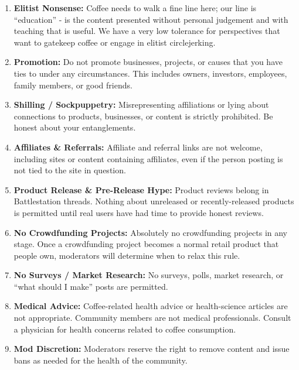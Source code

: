 \begin{enumerate}
    \item \textbf{Elitist Nonsense:} Coffee needs to walk a fine line here; our line is ``education'' - is the content presented without personal judgement and with teaching that is useful. We have a very low tolerance for perspectives that want to gatekeep coffee or engage in elitist circlejerking.
    
    \item \textbf{Promotion:} Do not promote businesses, projects, or causes that you have ties to under any circumstances. This includes owners, investors, employees, family members, or good friends.
    
    \item \textbf{Shilling / Sockpuppetry:} Misrepresenting affiliations or lying about connections to products, businesses, or content is strictly prohibited. Be honest about your entanglements.
    
    \item \textbf{Affiliates \& Referrals:} Affiliate and referral links are not welcome, including sites or content containing affiliates, even if the person posting is not tied to the site in question.
    
    \item \textbf{Product Release \& Pre-Release Hype:} Product reviews belong in Battlestation threads. Nothing about unreleased or recently-released products is permitted until real users have had time to provide honest reviews.
    
    \item \textbf{No Crowdfunding Projects:} Absolutely no crowdfunding projects in any stage. Once a crowdfunding project becomes a normal retail product that people own, moderators will determine when to relax this rule.
    
    \item \textbf{No Surveys / Market Research:} No surveys, polls, market research, or ``what should I make'' posts are permitted.
    
    \item \textbf{Medical Advice:} Coffee-related health advice or health-science articles are not appropriate. Community members are not medical professionals. Consult a physician for health concerns related to coffee consumption.
    
    \item \textbf{Mod Discretion:} Moderators reserve the right to remove content and issue bans as needed for the health of the community.
\end{enumerate}

